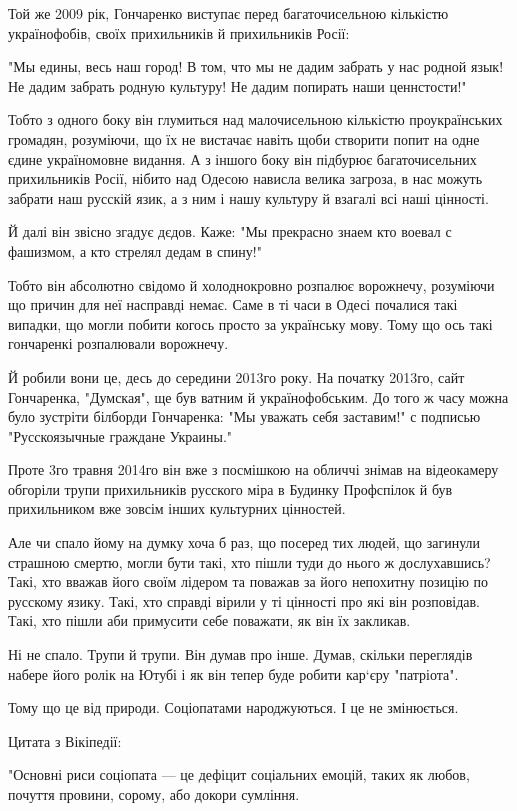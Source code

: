 \begin{itemize}
Той же 2009 рік, Гончаренко виступає перед багаточисельною кількістю
українофобів, своїх прихильників й прихильників Росії:

"Мы едины, весь наш город! В том, что мы не дадим забрать у нас родной язык! Не
дадим забрать родную культуру! Не дадим попирать наши ценнстости!"

Тобто з одного боку він глумиться над малочисельною кількістю проукраїнських
громадян, розуміючи, що їх не вистачає навіть щоби створити попит на одне єдине
україномовне видання. А з іншого боку він підбурює багаточисельних прихильників
Росії, нібито над Одесою нависла велика загроза, в нас можуть забрати наш
русскій язик, а з ним і нашу культуру й взагалі всі наші цінності.

Й далі він звісно згадує дєдов. Каже: "Мы прекрасно знаем кто воевал с
фашизмом, а кто стрелял дедам в спину!"

Тобто він абсолютно свідомо й холоднокровно розпалює ворожнечу, розуміючи що
причин для неї насправді немає. Саме в ті часи в Одесі почалися такі випадки,
що могли побити когось просто за українську мову. Тому що ось такі гончаренкі
розпалювали ворожнечу.

Й робили вони це, десь до середини 2013го року. На початку 2013го, сайт
Гончаренка, "Думская", ще був ватним й українофобським. До того ж часу можна
було зустріти білборди Гончаренка: "Мы уважать себя заставим!" с подписью
"Русскоязычные граждане Украины."

Проте 3го травня 2014го він вже з посмішкою на обличчі знімав на відеокамеру
обгоріли трупи прихильників русского міра в Будинку Профспілок й був
прихильником вже зовсім інших культурних цінностей.

Але чи спало йому на думку хоча б раз, що посеред тих людей, що загинули
страшною смертю, могли бути такі, хто пішли туди до нього ж дослухавшись? Такі,
хто вважав його своїм лідером та поважав за його непохитну позицію по русскому
язику. Такі, хто справді вірили у ті цінності про які він розповідав. Такі, хто
пішли аби примусити себе поважати, як він їх закликав.

Ні не спало. Трупи й трупи. Він думав про інше. Думав, скільки переглядів
набере його ролік на Ютубі і як він тепер буде робити кар`єру "патріота".

Тому що це від природи. Соціопатами народжуються. І це не змінюється.

Цитата з Вікіпедії:

"Основні риси соціопата — це дефіцит соціальних емоцій, таких як любов, почуття
провини, сорому, або докори сумління.


\end{itemize}
